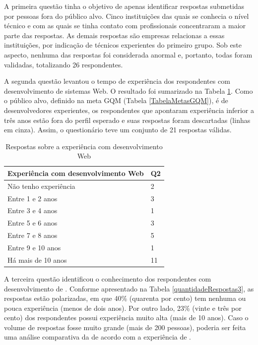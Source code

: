 A primeira questão tinha o objetivo de apenas identificar respostas
submetidas por pessoas fora do público alvo. Cinco instituições das quais se
conhecia o nível técnico e com as quais se tinha contato com profissionais
concentraram a maior parte das respostas. As demais respostas são empresas
relacionas a essas instituições, por indicação de técnicos experientes
do primeiro grupo. Sob este aspecto, nenhuma das respostas foi considerada
anormal e, portanto, todas foram validadas, totalizando 26 respondentes.

A segunda questão levantou o tempo de experiência dos respondentes com
desenvolvimento de sistemas Web. O resultado foi sumarizado na Tabela
\ref{quantidadeRespostas2}. Como o público alvo, definido na meta GQM (Tabela
\ref{TabelaMetasGQM}), é de desenvolvedores experientes, os respondentes que
apontaram experiência inferior a três anos estão fora do perfil esperado e suas
respostas foram descartadas (linhas em cinza). Assim, o questionário teve um
conjunto de 21 respostas válidas.

\begin{table}[!bth] 
\centering
\scriptsize
\begin{tabular}{p{3cm}|p{1cm}}
\hline   
Experiência com desenvolvimento Web& Q2 \\
\hline   
\cellcolor{light-gray}Não tenho experiência &  \cellcolor{light-gray}2  \\
\cellcolor{light-gray}Entre 1 e 2 anos      &  \cellcolor{light-gray}3  \\
Entre 3 e 4 anos      &  1  \\
Entre 5 e 6 anos      &  3  \\
Entre 7 e 8 anos      &  5  \\
Entre 9 e 10 anos     &  1  \\
Há mais de 10 anos    & 11  \\
\end{tabular}
\caption{Respostas sobre a experiência com desenvolvimento Web}
\label{quantidadeRespostas2}
\end{table}

A terceira questão identificou o conhecimento dos respondentes com
desenvolvimento de \wss{}. Conforme apresentado na Tabela
\ref{quantidadeRespostas3}, as respostas estão polarizadas, em que 40\%
(quarenta por cento) tem nenhuma ou pouca experiência (menos de dois anos). Por
outro lado, 23\% (vinte e três por cento) dos respondentes possui experiência
muito alta (mais de 10 anos). Caso o volume de respostas fosse muito grande (mais de
200 pessoas), poderia ser feita uma análise comparativa da \neoidl{} de acordo
com a experiência de \ws{}.


